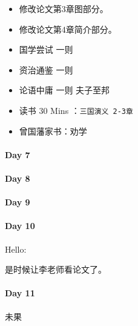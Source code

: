 \documentclass[UTF8,a4paper,8pt]{ctexart}
\begin{document}
		 	\begin{itemize}[itemindent = 1em]
		 		\renewcommand\labelitemi{\makebox[0pt][l]{$\square$}\raisebox{.15ex}{\hspace{0.1em}$\checkmark$}}	
		 			
		 		\item    修改论文第3章图部分。
		 		\item    修改论文第4章简介部分。
		 		
		 		
		 		\renewcommand\labelitemi{\makebox[0pt][l]{$\square$}\hspace{1em}}
		 		\item   国学尝试 一则
		 		\item 	资治通鉴 一则 
		 		\item 	论语中庸 一则 夫子至邦
		 		\item   读书  30 Mins	：\verb|三国演义 2-3章|
		 		\item   曾国藩家书：劝学
		 	\end{itemize}
 	 \paragraph{Day 7       \quad     }
 	 \paragraph{Day 8       \quad     }
 	 \paragraph{Day 9       \quad     }
 	 \paragraph{Day 10      \quad     }
	 	 Hello:
	 	 
	 	 是时候让李老师看论文了。
 	 \paragraph{Day 11      \quad     }
	 	 未果
\end{document}
